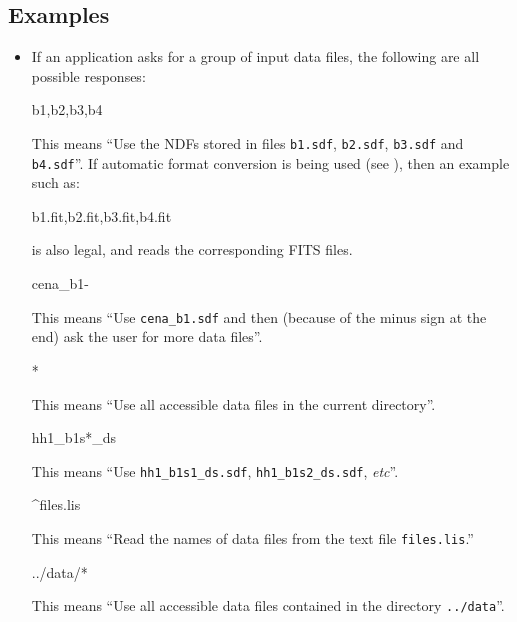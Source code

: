 \documentclass[twoside,11pt]{starlink}
\begin{document}
\subsection{Examples}
\begin{itemize}
\item If an application asks for a group of input data files, the following
are all possible responses:

\begin{terminalv}
b1,b2,b3,b4
\end{terminalv}
\vspace{-3mm}

This means ``Use the NDFs stored in files \verb+b1.sdf+, \verb+b2.sdf+,
\verb+b3.sdf+ and \verb+b4.sdf+''. If automatic format conversion is being
used (see ), then an example such
as:

\begin{terminalv}
b1.fit,b2.fit,b3.fit,b4.fit
\end{terminalv}

is also legal, and reads the corresponding FITS files.

\begin{terminalv}
cena_b1-
\end{terminalv}
\vspace{-3mm}

This means ``Use \verb+cena_b1.sdf+ and then (because of the minus sign
at the end) ask the user for more data files''.

\begin{terminalv}
*
\end{terminalv}
\vspace{-3mm}
This means ``Use all accessible data files in the current directory''.

\begin{terminalv}
hh1_b1s*_ds
\end{terminalv}
\vspace{-3mm}
This means ``Use \verb+hh1_b1s1_ds.sdf+, \verb+hh1_b1s2_ds.sdf+, \emph{etc}''.

\begin{terminalv}
^files.lis
\end{terminalv}
\vspace{-3mm}
This means ``Read the names of data files from the text file
\verb+files.lis+.''

\begin{terminalv}
../data/*
\end{terminalv}
\vspace{-3mm}
This means ``Use all accessible data files contained in the directory
\verb+../data+''.


\end{itemize}
\end{document}
